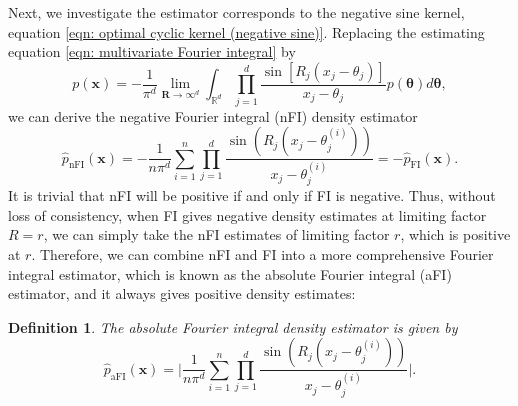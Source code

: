 \documentclass[%
 reprint,
 amsmath,amssymb,
 aps,
]{revtex4-2}
\newtheorem{definition}[theorem]{Definition}
\def\R{\mathbb{R}}
\def\btheta{\boldsymbol{\theta}}
\def\btheta{\boldsymbol{\theta}}
\def\xbold{\mathbf{x}}
\def\Rbold{\mathbf{R}}
\newcommand{\btheta}{\mbox{\boldmath $\theta$}}
\begin{document}
Next, we investigate the estimator corresponds to the negative sine kernel, equation
\eqref{eqn: optimal cyclic kernel (negative sine)}. Replacing the estimating equation \eqref{eqn: multivariate Fourier integral} by
\begin{equation} \label{eqn: negative multivariate Fourier integral}
    p(\xbold) = -\frac{1}{\pi^d} \lim_{\Rbold \to \infty^d} \int_{\R^d} \prod_{j=1}^d \frac{\sin[R_j(x_j-\theta_j)]}{x_j-\theta_j} p(\btheta)d\btheta,
\end{equation}
we can derive the negative Fourier integral (nFI) density estimator
\begin{equation} \label{eqn: multivariate negative Fourier integral density estimator}
    \hat{p}_\text{nFI}(\mathbf{x}) = -\frac{1}{n\pi^d}\sum_{i = 1}^n \prod_{j = 1}^d \frac{\sin(R_j(x_j - \theta_j^{(i)}))}{x_j - \theta_j^{(i)}} = -\hat{p}_\text{FI}(\mathbf{x}).
\end{equation}
It is trivial that nFI will be positive if and only if FI is negative. Thus, without loss of consistency, when FI gives negative density estimates at limiting factor $R=r$, we can simply take the nFI estimates of limiting factor $r$, which is positive at $r$. Therefore, we can combine nFI and FI into a more comprehensive Fourier integral estimator, which is known as the absolute Fourier integral (aFI) estimator, and it always gives positive density estimates:
\begin{definition}
    The absolute Fourier integral density estimator is given by
    \begin{equation} \label{eqn: absolute Fourier integral estimator}
        \hat{p}_\text{aFI}(\mathbf{x}) = \bigg|\frac{1}{n\pi^d}\sum_{i = 1}^n \prod_{j = 1}^d \frac{\sin(R_j(x_j - \theta_j^{(i)}))}{x_j - \theta_j^{(i)}}\bigg|.
    \end{equation}
\end{definition}
\end{document}
